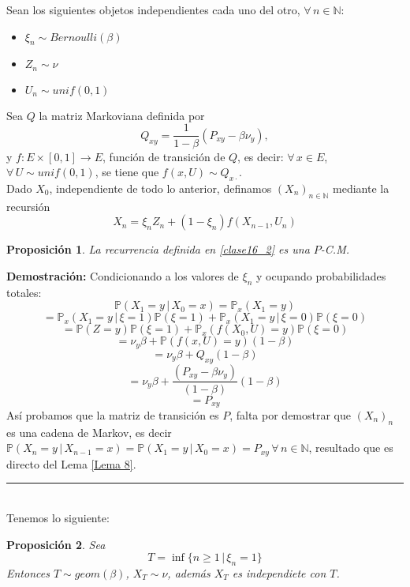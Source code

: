 \documentclass[a4paper]{article}
\newcommand{\prob}{\mathbb{P}}
\newtheorem{prop}{Proposici\'on}
\numberwithin{equation}{subsection}
\def\N{\mathbb N}
\begin{document}
Sean los siguientes objetos independientes cada uno del otro, $\forall\,n\in\N$:
\begin{itemize}
    \item $\xi_n \sim Bernoulli(\beta)$
    \item $Z_n \sim \nu$
    \item $U_n \sim unif(0,1)$
\end{itemize}
Sea $Q$ la matriz Markoviana definida por
\[Q_{xy} = \frac{1}{1-\beta}(P_{xy}-\beta \nu_y),\]
y $f:E\times [0,1]\rightarrow E$, función de transición de $Q$, es decir: $\forall\,x\in E$, $\forall\,U\sim unif(0,1)$, se tiene que $f(x,U)\sim Q_{x\cdot}$.\\ \newline
Dado $X_0$, independiente de todo lo anterior, definamos $(X_n)_{n\in \N}$ mediante la recursión
\begin{equation}
    X_n = \xi_n Z_n + (1-\xi_n)f(X_{n-1},U_n)
    \label{clase16_2}
\end{equation}
\begin{prop}
\label{porp}
La recurrencia definida en \ref{clase16_2} es una $P$-C.M.
\end{prop}

\textbf{Demostración: }Condicionando a los valores de $\xi_n$ y ocupando probabilidades totales:
\[\prob(X_1 = y\,|\,X_0=x) = \prob_x(X_1=y)\]
\[= \prob_x(X_1=y\,|\,\xi = 1)\prob(\xi =1) + \prob_x(X_1=y\,|\,\xi=0)\prob(\xi=0)\]
\[ = \prob(Z = y)\prob(\xi = 1) + \prob_x(f(X_0,U)=y)\prob(\xi=0)\]
\[ = \nu_y\beta + \prob(f(x,U)=y)(1-\beta)\]
\[ = \nu_y \beta + Q_{xy}(1-\beta)\]
\[=\nu_y\beta + \frac{(P_{xy}-\beta \nu_y)}{(1-\beta)}(1-\beta)\]
\[= P_{xy}\]
Así probamos que la matriz de transición es $P$, falta por demostrar que $(X_n)_n$ es una cadena de Markov, es decir $\prob(X_n=y\,|\,X_{n-1}=x)=\prob(X_1=y\,|\,X_0=x)=P_{xy}\,\forall\,n\in\N$, resultado que es directo del Lema \ref{Lema 8}.\\
\rule{0.7em}{0.7em}\\ \newline
Tenemos lo siguiente:
\begin{prop}
Sea
\[T = \inf\{n\geq 1\,|\,\xi_n=1\}\]
Entonces $T\sim geom(\beta)$, $X_T \sim \nu$, además $X_T$ es independiete con $T$.
\end{prop}
\end{document}

